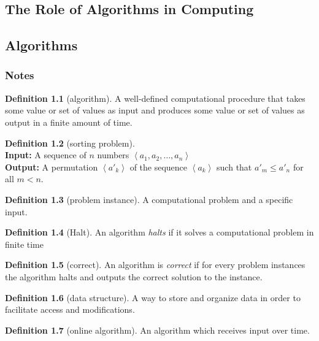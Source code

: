 \documentclass[oneside]{book}
\theoremstyle{definition}
\newtheorem{definition}{Definition}[chapter]
\theoremstyle{plain}
\newcommand{\seq}[1]{\left\langle #1 \right\rangle}
\begin{document}
\mainmatter
\begin{spacing}{1.618}
\chapter{The Role of Algorithms in Computing}
\section{Algorithms}
\subsection{Notes}
\begin{definition}[algorithm]
	A well-defined computational procedure that takes some value or set of values as input and produces some value or set of values as output in a finite amount of time.
\end{definition}

\begin{definition}[sorting problem]
	~\\
	\textbf{Input: } A sequence of $n$ numbers $\seq{a_1, a_2, \dots, a_n}$ \\
	\textbf{Output:} A permutation $\seq{a'_k}$ of the sequence $\seq{a_k}$ such that $a'_m \leq a'_n$ for all $m < n$. 
\end{definition}

\begin{definition}[problem instance]
	A computational problem and a specific input.
\end{definition}

\begin{definition}[Halt]
	An algorithm \emph{halts} if it solves a computational problem in finite time
\end{definition}

\begin{definition}[correct]
	An algorithm is \emph{correct} if for every problem instances the algorithm halts and outputs the correct solution to the instance.
\end{definition}

\begin{definition}[data structure]
	A way to store and organize data in order to facilitate access and modifications.
\end{definition}

\begin{definition}[online algorithm]
	An algorithm which receives input over time.
\end{definition}


\end{spacing}
\end{document}
